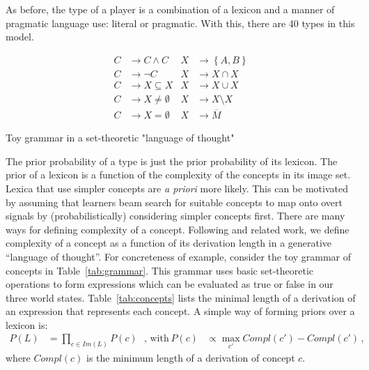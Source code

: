 \documentclass[a4paper]{article}
\newcommand{\set}[1]{\left\{#1\right\}}
\begin{document}
As before, the type of a player is a combination of a lexicon and a manner of pragmatic
language use: literal or pragmatic. With this, there are 40 types in this model.

\begin{table}
  \centering
  \begin{align*}
    C & \rightarrow C \wedge C 
    & 
    X & \rightarrow \set{A,B} \\
    C & \rightarrow\neg C 
    & 
    X & \rightarrow X \cap X \\
    C & \rightarrow X \subseteq X
    & 
    X & \rightarrow X \cup X \\
    C & \rightarrow X \neq \emptyset
    & 
    X & \rightarrow X \setminus X \\
    C & \rightarrow X = \emptyset     
    & 
    X & \rightarrow \overline{M}
  \end{align*}
  \caption{Toy grammar in a set-theoretic "language of thought"}
  \label{tab:grammar}
\end{table}


The prior probability of a type is just the prior probability of its lexicon. The prior of a
lexicon is a function of the complexity of the concepts in its image set. Lexica that use
simpler concepts are \emph{a priori} more likely. This can be motivated by assuming that
learners beam search for suitable concepts to map onto overt signals by (probabilistically)
considering simpler concepts first. There are many ways for defining complexity of a
concept. Following \citet{piantadosi+etal:underreview} and related work, we define complexity
of a concept as a function of its derivation length in a generative ``language of
thought''. For concreteness of example, consider the toy grammar of concepts in
Table~\ref{tab:grammar}. This grammar uses basic set-theoretic operations to form expressions
which can be evaluated as true or false in our three world states. Table~\ref{tab:concepts}
lists the minimal length of a derivation of an expression that represents each concept. A
simple way of forming priors over a lexicon is:
\begin{align*}
  P(L)  & = \prod_{c \in Im(L)} P(c)  \ \ \ \text{, with} & 
  P(c) & \propto \max_{c'}Compl(c') - Compl(c')\,,
\end{align*}
where $Compl(c)$ is the minimum length of a derivation of concept $c$.



\end{document}
